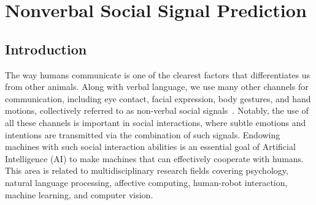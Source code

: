 
\chapter{Nonverbal Social Signal Prediction}
\label{chapter:prediction}
%


\section{Introduction}
The way humans communicate is one of the clearest factors that differentiates us from other animals. Along with verbal language, we use many other channels for communication, including eye contact, facial expression, body gestures, and hand motions, collectively referred to as non-verbal social signals~\cite{Moore13}. Notably, the use of all these channels is important in social interactions, where subtle emotions and intentions are transmitted via the combination of such signals. Endowing machines with such social interaction abilities is an essential goal of Artificial Intelligence (AI) to make machines that can effectively cooperate with humans. This area is related to multidisciplinary research fields covering psychology, natural language processing, affective computing, human-robot interaction, machine learning, and computer vision.


